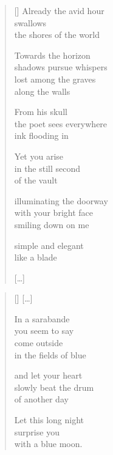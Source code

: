 \documentclass[14pt]{extbook}
\newcommand*{\centeredornament}{\centerline{\pgfornament[width=6cm]{88}}}
\begin{document}
\begin{verse}[\versewidth]
  Already the avid hour \\
  swallows \\
  the shores of the world

  Towards the horizon \\
  shadows pursue whispers \\
  lost among the graves \\
  along the walls

  From his skull \\
  the poet sees everywhere \\
  ink flooding in

  Yet you arise \\
  in the still second \\
  of the vault

  illuminating the doorway \\
  with your bright face \\
  smiling down on me

  simple and elegant \\
  like a blade

  \hfill [\ldots]
\end{verse}

\newpage

\vspace*{-15mm}
\centeredornament
\vspace*{-7mm}

\poemtitle*{\phantom{XIII}}

\settowidth{\versewidth}{slowly beat the drum}

\begin{verse}[\versewidth]
  \textnormal{[\ldots]}

  In a sarabande \\
  you seem to say \\
  come outside \\
  in the fields of blue

  and let your heart \\
  slowly beat the drum \\
  of another day

  Let this long night \\
  surprise you \\
  with a blue moon.
\end{verse}

\end{document}
